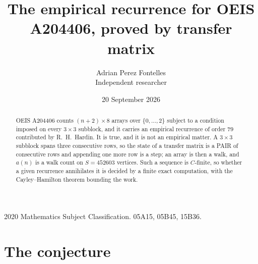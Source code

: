\documentclass[11pt,a4paper]{article}
\title{The empirical recurrence for OEIS A204406, proved by transfer matrix}
\author{Adrian Perez Fontelles\\ \small Independent researcher}
\date{20 September 2026}
\theoremstyle{plain}
\theoremstyle{definition}
\begin{document}
\maketitle

\begin{abstract}
OEIS A204406 counts $(n+2)\times8$ arrays over $\{0,\dots,2\}$ subject to a condition imposed on
every $3\times3$ subblock, and it carries an empirical recurrence of order $79$
contributed by R.~H.~Hardin. It is true, and it is not an empirical matter. A $3\times3$
subblock spans three consecutive rows, so the state of a transfer matrix is a PAIR of
consecutive rows and appending one more row is a step; an array is then a walk, and
$a(n)$ is a walk count on $S=452603$ vertices. Such a sequence is $C$-finite, so whether a given
recurrence annihilates it is decided by a finite exact computation, with the Cayley--Hamilton
theorem bounding the work.
\end{abstract}

\noindent\small 2020 Mathematics Subject Classification. 05A15, 05B45, 15B36.\normalsize

\section{The conjecture}
\end{document}
